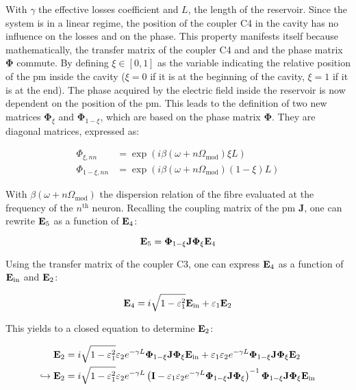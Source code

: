 With $\gamma$ the effective losses coefficient and $L$, the length of the reservoir. Since the system is in a linear regime, the position of the coupler C4 in the cavity has no influence on the losses and on the phase. This property manifests itself because mathematically, the transfer matrix of the coupler C4 and and the phase matrix $\mathbf{\Phi}$ commute. By defining $\xi \in [0,1]$ as the variable indicating the relative position of the \gls{pm} inside the cavity ($\xi = 0$ if it is at the beginning of the cavity, $\xi=1$ if it is at the end). The phase acquired  by the electric field inside the reservoir is now dependent on the position of the \gls{pm}. This leads to the definition of two new matrices $\mathbf{\Phi}_\xi$ and $\mathbf{\Phi}_{1-\xi}$, which are based on the phase matrix $\mathbf{\Phi}$. They are diagonal matrices, expressed as:

\begin{align}
	\Phi_{\xi,nn} &= \exp{ \left(i \beta (\omega+n\Omega_{\text{mod}}) \xi L \right)} \nonumber \\
	\Phi_{1-\xi,nn} &= \exp{ \left(i \beta (\omega+n\Omega_{\text{mod}}) (1-\xi) L \right)}
\end{align}

With $\beta (\omega+n\Omega_{\text{mod}})$ the dispersion relation of the fibre evaluated at the frequency of the $n^{\text{th}}$ neuron. Recalling the coupling matrix of the \gls{pm} $\mathbf{J}$, one can rewrite $\mathbf{E}_{\text{5}}$ as a function of $\mathbf{E}_{\text{4}}$:

\begin{equation}
	\mathbf{E}_{\text{5}} = \mathbf{\Phi}_{1-\xi} \mathbf{J} \mathbf{\Phi}_\xi \mathbf{E}_{\text{4}}
\end{equation}

Using the transfer matrix of the coupler C3, one can express $\mathbf{E}_{\text{4}}$ as a function of $\mathbf{E}_{\text{in}}$ and $\mathbf{E}_{\text{2}}$:

\begin{equation}
	\mathbf{E}_{\text{4}} = i\sqrt{1-\varepsilon_1^2} \mathbf{E}_{\text{in}} + \varepsilon_1 \mathbf{E}_{\text{2}}
\end{equation}

This yields to a closed equation to determine $\mathbf{E}_{\text{2}}$:

\begin{align}
	\mathbf{E}_{\text{2}} &= i\sqrt{1-\varepsilon_1^2} \varepsilon_2 e^{-\gamma L} \mathbf{\Phi}_{1-\xi} \mathbf{J} \mathbf{\Phi}_\xi \mathbf{E}_{\text{in}} + \varepsilon_1 \varepsilon_2 e^{-\gamma L} \mathbf{\Phi}_{1-\xi} \mathbf{J} \mathbf{\Phi}_\xi \mathbf{E}_{\text{2}} \nonumber \\
	\hookrightarrow \mathbf{E}_{\text{2}} &= i \sqrt{1-\varepsilon_1^2} \varepsilon_2 e^{-\gamma L} \left( \mathbf{I} - \varepsilon_1 \varepsilon_2 e^{- \gamma L} \mathbf{\Phi}_{1-\xi} \mathbf{J} \mathbf{\Phi}_\xi \right)^{-1} \mathbf{\Phi}_{1-\xi} \mathbf{J} \mathbf{\Phi}_\xi \mathbf{E}_{\text{in}}
\end{align}

